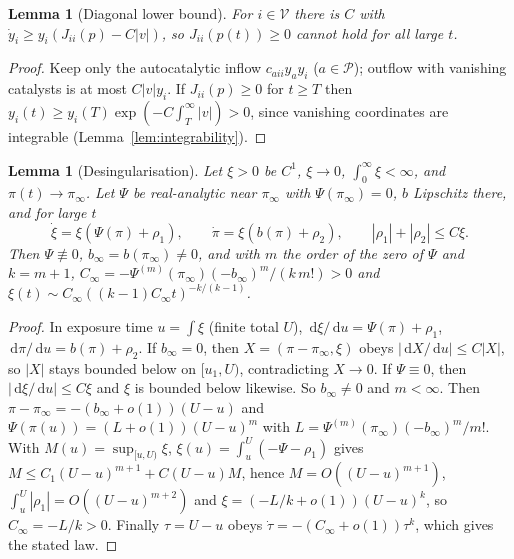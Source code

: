 \documentclass[11pt,a4paper]{article}
\newtheorem{lemma}[theorem]{Lemma}
\theoremstyle{definition}\newtheorem{definition}[theorem]{Definition}
\theoremstyle{remark}\newtheorem{remark}[theorem]{Remark}
\newcommand{\dd}{\,\mathrm d}
\newcommand{\Vs}{\mathcal V}
\newcommand{\Ps}{\mathcal P}
\begin{document}
\begin{lemma}[Diagonal lower bound]
\label{lem:diag4}
For $i\in\Vs$ there is $C$ with $\dot y_i\ge y_i(J_{ii}(p)-C|v|)$, so
$J_{ii}(p(t))\ge0$ cannot hold for all large $t$.
\end{lemma}
\begin{proof}
Keep only the autocatalytic inflow $c_{aii}y_ay_i$ ($a\in\Ps$); outflow
with vanishing catalysts is at most $C|v|y_i$. If $J_{ii}(p)\ge0$ for
$t\ge T$ then $y_i(t)\ge y_i(T)\exp(-C\int_T^\infty|v|)>0$, since vanishing
coordinates are integrable (Lemma~\ref{lem:integrability}).
\end{proof}

\begin{lemma}[Desingularisation]
\label{lem:desing}
Let $\xi>0$ be $C^1$, $\xi\to0$, $\int_0^\infty\xi<\infty$, and $\pi(t)\to\pi_\infty$.
Let $\Psi$ be real-analytic near $\pi_\infty$ with $\Psi(\pi_\infty)=0$, $b$
Lipschitz there, and for large $t$
\[
\dot\xi=\xi(\Psi(\pi)+\rho_1),\qquad \dot\pi=\xi(b(\pi)+\rho_2),\qquad
|\rho_1|+|\rho_2|\le C\xi .
\]
Then $\Psi\not\equiv0$, $b_\infty=b(\pi_\infty)\ne0$, and with $m$ the order
of the zero of $\Psi$ and $k=m+1$,
$C_\infty=-\Psi^{(m)}(\pi_\infty)(-b_\infty)^m/(k\,m!)>0$ and
$\xi(t)\sim C_\infty((k-1)C_\infty t)^{-k/(k-1)}$.
\end{lemma}
\begin{proof}
In exposure time $u=\int\xi$ (finite total $U$),
$\dd\xi/\dd u=\Psi(\pi)+\rho_1$, $\dd\pi/\dd u=b(\pi)+\rho_2$. If
$b_\infty=0$, then $X=(\pi-\pi_\infty,\xi)$ obeys $|\dd X/\dd u|\le C|X|$,
so $|X|$ stays bounded below on $[u_1,U)$, contradicting $X\to0$. If
$\Psi\equiv0$, then $|\dd\xi/\dd u|\le C\xi$ and $\xi$ is bounded below
likewise. So $b_\infty\ne0$ and $m<\infty$. Then
$\pi-\pi_\infty=-(b_\infty+o(1))(U-u)$ and
$\Psi(\pi(u))=(L+o(1))(U-u)^m$ with
$L=\Psi^{(m)}(\pi_\infty)(-b_\infty)^m/m!$. With $M(u)=\sup_{[u,U)}\xi$,
$\xi(u)=\int_u^U(-\Psi-\rho_1)$ gives $M\le C_1(U-u)^{m+1}+C(U-u)M$, hence
$M=O((U-u)^{m+1})$, $\int_u^U|\rho_1|=O((U-u)^{m+2})$ and
$\xi=(-L/k+o(1))(U-u)^k$, so $C_\infty=-L/k>0$. Finally $\tau=U-u$ obeys
$\dot\tau=-(C_\infty+o(1))\tau^k$, which gives the stated law.
\end{proof}
\end{document}
